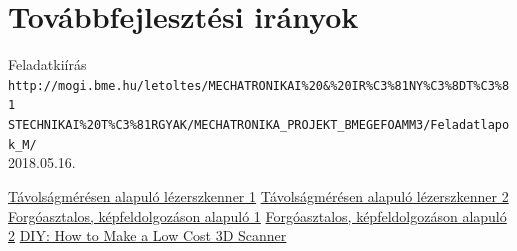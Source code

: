 \documentclass[12pt,a4paper]{article}
\begin{document}
\section{Továbbfejlesztési irányok}
\newpage
\begin{thebibliography}{9} 
Feladatkiírás\\
\texttt{http://mogi.bme.hu/letoltes/MECHATRONIKAI\%20\&\%20IR\%C3\%81NY\%C3\%8DT\%C3\%81\\
STECHNIKAI\%20T\%C3\%81RGYAK/MECHATRONIKA\_PROJEKT\_BMEGEFOAMM3/Feladatlapok\_M/}\\
2018.05.16.


\href{http://lanmarservices.com/wp-content/uploads/2014/04/Faro_Building_Scan.jpg}{Távolságmérésen alapuló lézerszkenner 1}
\href{https://i1.wp.com/cmfenews.com/wp-content/uploads/2018/04/3D-Laser.jpg?fit=1600%2C1200&ssl=1}{Távolságmérésen alapuló lézerszkenner 2}
\href{https://i.ytimg.com/vi/RVgyyIlQydg/maxresdefault.jpg}{Forgóasztalos, képfeldolgozáson alapuló 1}
\href{https://3dprint.com/wp-content/uploads/2015/03/Fig.-1-New-Perceptron-Smart3D-Laser-Scanning-System-3.jpg}{Forgóasztalos, képfeldolgozáson alapuló 2}
\href{http://www.instructables.com/id/3D-Laser-Scanning-DIY/}{DIY: How to Make a Low Cost 3D Scanner}

\end{thebibliography}
\end{document}

